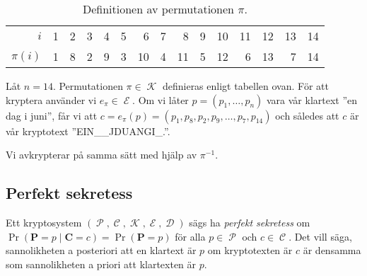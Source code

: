 \documentclass{beamer}
\theoremstyle{definition}
\DeclareMathOperator{\p}{\mathcal{P}}
\let\P\p
\DeclareMathOperator{\C}{\mathcal{C}}
\DeclareMathOperator{\K}{\mathcal{K}}
\DeclareMathOperator{\E}{\mathcal{E}}
\DeclareMathOperator{\D}{\mathcal{D}}
\let\stoch\mathbf
\renewcommand{\p}{\stoch P}
\renewcommand{\c}{\stoch C}
\begin{document}
\begin{frame}{\insertsubsectionhead}
  \begin{table}
    \centering\small
    \begin{tabular}{r|rrrrrrrrrrrrrr}
      \toprule
      \(i\)       & 1 & 2 & 3 & 4 & 5 & 6 & 7 & 8 & 9 & 10 & 11 & 12 & 13 & 14 
      \\
      \(\pi(i)\)  & 1 & 8 & 2 & 9 & 3 & 10 & 4 & 11 & 5 & 12 & 6 & 13 & 7 & 14 
      \\
      \bottomrule
    \end{tabular}
    \caption{Definitionen av permutationen \(\pi\).}
    \label{tbl:pi}
  \end{table}

  \begin{example}\label{ex:permutationEnDagIJuni}
    Låt \(n = 14\).
    Permutationen \(\pi\in \K\) definieras enligt tabellen ovan.
    För att kryptera använder vi \(e_\pi\in \E\).
    Om vi låter \(p = (p_1, \ldots, p_n)\) vara vår klartext ''en dag i juni'', 
    får vi att \(c = e_\pi(p) = (p_1, p_8, p_2, p_9, \ldots, p_7, p_{14})\) och 
    således att \(c\) är vår kryptotext ''EIN\_\_JDUANGI\_.''.

    Vi avkrypterar på samma sätt med hjälp av \(\pi^{-1}\).
  \end{example}
\end{frame}


\subsection{Perfekt sekretess}

\begin{frame}{\insertsubsectionhead}
  \begin{definition}\label{def:perfectSecrecy}
    Ett kryptosystem \((\P, \C, \K, \E, \D)\) sägs ha \emph{perfekt sekretess} 
    om \(\Pr(\p = p\mid \c = c) = \Pr(\p = p)\) för alla \(p\in \P\) och \(c\in 
    \C\).
    Det vill säga, sannolikheten a posteriori att en klartext är \(p\) om 
    kryptotexten är \(c\) är densamma som sannolikheten a priori att klartexten 
    är \(p\).
  \end{definition}
\end{frame}
\end{document}
